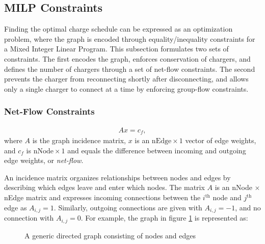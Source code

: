 \subsection{MILP Constraints}
\par Finding the optimal charge schedule can be expressed as an optimization problem, where the graph is encoded through equality/inequality constraints for a Mixed Integer Linear Program. This subsection formulates two sets of constraints.  The first encodes the graph, enforces conservation of chargers, and defines the number of chargers through a set of net-flow constraints. The second prevents the charger from reconnecting shortly after disconnecting, and allows only a single charger to connect at a time by enforcing group-flow constraints.
\subsubsection{Net-Flow Constraints}
\begin{align}\label{eqn:flow}
	Ax=c_f,	
\end{align}
where $A$ is the graph incidence matrix, $x$ is an $\text{nEdge} \times 1$ vector of edge weights, and $c_f$ is $\text{nNode} \times 1$ and equals the difference between incoming and outgoing edge weights, or \textit{net-flow}.
\par  An incidence matrix organizes relationships between nodes and edges by describing which edges leave and enter which nodes. The matrix $A$ is an nNode $\times$ nEdge matrix and expresses incoming connections between the $i^{\text{th}}$ node and $j^{\text{th}}$ edge as $A_{i,j} = 1$. Similarly, outgoing connections are given with $A_{i,j} = -1$, and no connection with $A_{i,j} = 0$. For example, the graph in figure \ref{fig:genericGraph} is represented as:
\begin{figure}
	\centering
	\caption{A generic directed graph consisting of nodes and edges}
	\label{fig:genericGraph}
\end{figure}
